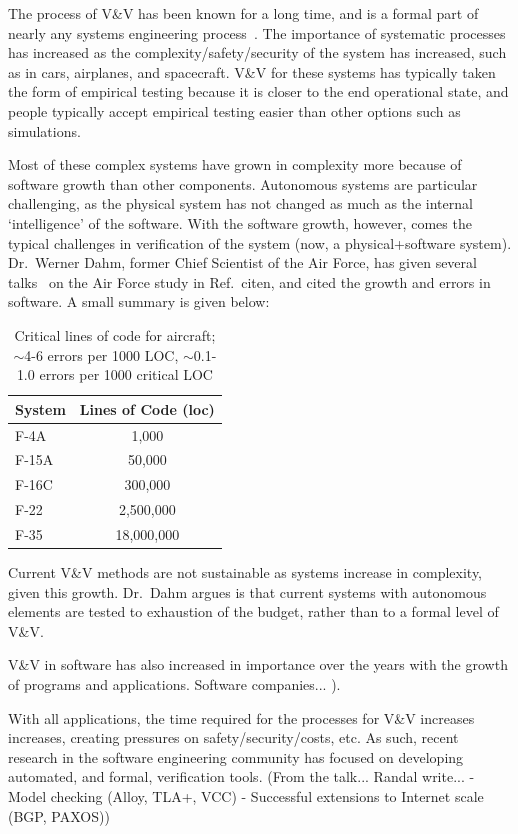 The process of V\&V has been known for a long time, and is a formal part of nearly any systems engineering process~\cite{syseng-book}. The importance  of systematic processes has increased as the complexity/safety/security of the system has increased, such as in cars, airplanes, and spacecraft. V\&V for these systems has typically taken the form of empirical testing because it is closer to the end operational state, and people typically accept empirical testing easier than other options such as simulations. 

Most of these complex systems have grown in complexity more because of software growth than other components. Autonomous systems are particular challenging, as the physical system has not changed as much as the internal `intelligence' of the software. With the software growth, however, comes the typical challenges in verification of the system (now, a physical+software system). Dr.\ Werner Dahm, former Chief Scientist of the Air Force, has given several talks~\cite{gnc-talk} on the Air Force study in Ref.~citen{}, and cited the growth and errors in software. A small summary is given below:

\begin{table}
\begin{center}
\begin{tabular}{l|c}
System &  Lines of Code (loc)\\ \hline
F-4A & 1,000\\
F-15A &  50,000\\
F-16C &  300,000\\
F-22 &  2,500,000\\
F-35 &  18,000,000
\end{tabular}
\caption{Critical lines of code for aircraft; $\sim$4-6 errors per 1000 LOC, $\sim$0.1-1.0 errors per 1000 critical LOC}
   \label{table:loc}
\end{center}
\end{table}

Current V\&V methods are not sustainable as systems increase in complexity, given this growth. Dr.\ Dahm argues is that current systems with autonomous elements are tested to exhaustion of the budget, rather than to a formal level of V\&V. 

V\&V in software has also increased in importance over the years with the growth of programs and applications. Software companies... ). 

With all applications, the time required for the processes for V\&V increases increases, creating pressures on safety/security/costs, etc. As such, recent research in the software engineering community has focused on developing automated, and formal, verification tools. (From the talk... Randal write...
- Model checking (Alloy, TLA+, VCC)
- Successful extensions to Internet scale (BGP, PAXOS))

